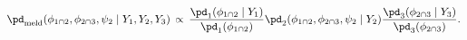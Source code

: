 \begin{equation}
  \pd_{\text{meld}} (\phi_{1 \cap 2}, \phi_{2 \cap 3}, \psi_{2} \mid Y_{1}, Y_{2}, Y_{3})
  \, \propto \, 
  \frac {
    \pd_{1}(\phi_{1 \cap 2} \mid Y_{1})
  } {
    \pd_{1}(\phi_{1 \cap 2})
  }
  \pd_{2}(\phi_{1 \cap 2}, \phi_{2 \cap 3}, \psi_{2} \mid Y_{2})
  \frac {
    \pd_{3}(\phi_{2 \cap 3} \mid Y_{3})
  } {
    \pd_{3}(\phi_{2 \cap 3})
  }.
  \label{eqn:normal-approx-melded-posterior-target}
\end{equation}